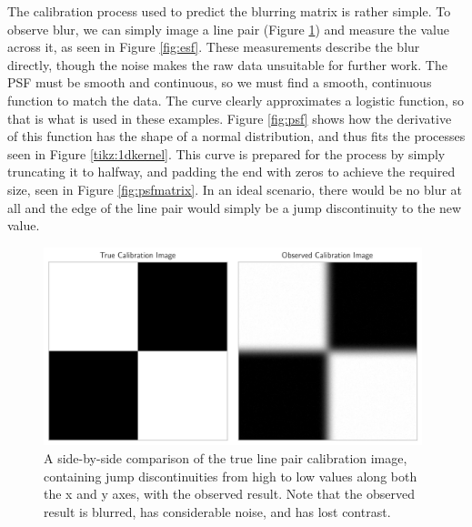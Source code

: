 \documentclass[letterpaper, 11pt, titlepage, twocolumn]{article}
\begin{document}
The calibration process used to predict the blurring matrix is rather simple. To observe blur, we can simply image a line pair (Figure \ref{fig:linepairs}) and measure the value across it, as seen in Figure \ref{fig:esf}. These measurements describe the blur directly, though the noise makes the raw data unsuitable for further work. The PSF must be smooth and continuous, so we must find a smooth, continuous function to match the data. The curve clearly approximates a logistic function, so that is what is used in these examples. Figure \ref{fig:psf} shows how the derivative of this function has the shape of a normal distribution, and thus fits the processes seen in Figure \ref{tikz:1dkernel}. This curve is prepared for the process by simply truncating it to halfway, and padding the end with zeros to achieve the required size, seen in Figure \ref{fig:psfmatrix}. In an ideal scenario, there would be no blur at all and the edge of the line pair would simply be a jump discontinuity to the new value.

\begin{figure}[H]
  \centering
  \includegraphics[width=11cm]{imgcompare.png}
  \caption{A side-by-side comparison of the true line pair calibration image, containing jump discontinuities from high to low values along both the x and y axes, with the observed result. Note that the observed result is blurred, has considerable noise, and has lost contrast.}
  \label{fig:linepairs}
\end{figure}
\end{document}

